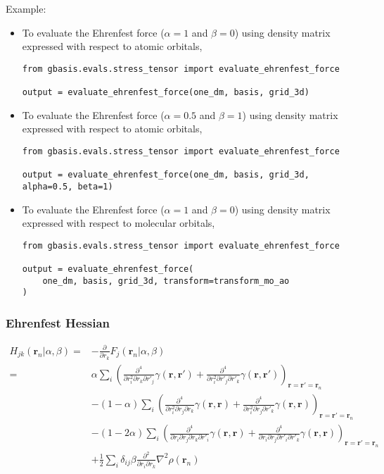\documentclass[letterpaper]{article}
\begin{document}
Example:
\begin{itemize}
\item To evaluate the Ehrenfest force ($\alpha=1$ and $\beta=0$)
  using density matrix expressed with respect to atomic orbitals,
  \begin{lstlisting}[xleftmargin=-25pt]
from gbasis.evals.stress_tensor import evaluate_ehrenfest_force

output = evaluate_ehrenfest_force(one_dm, basis, grid_3d)
\end{lstlisting}
\item To evaluate the Ehrenfest force ($\alpha=0.5$ and $\beta=1$)
  using density matrix expressed with respect to atomic orbitals,
  \begin{lstlisting}[xleftmargin=-25pt]
from gbasis.evals.stress_tensor import evaluate_ehrenfest_force

output = evaluate_ehrenfest_force(one_dm, basis, grid_3d, alpha=0.5, beta=1)
\end{lstlisting}
\item To evaluate the Ehrenfest force ($\alpha=1$ and $\beta=0$)
  using density matrix expressed with respect to molecular orbitals,
  \begin{lstlisting}[xleftmargin=-25pt]
from gbasis.evals.stress_tensor import evaluate_ehrenfest_force

output = evaluate_ehrenfest_force(
    one_dm, basis, grid_3d, transform=transform_mo_ao
)
\end{lstlisting}
\end{itemize}
\subsubsection{Ehrenfest Hessian}
\begin{equation}
  \begin{split}
    H_{jk}(\mathbf{r}_n | \alpha, \beta)
    =&
    - \frac{\partial}{\partial r_k} F_j(\mathbf{r}_n | \alpha, \beta)\\
    =&
    \alpha
    \sum_i
    \left(
      \frac{\partial^4}{\partial r^2_i \partial r_k \partial r'_j} \gamma(\mathbf{r}, \mathbf{r}')
      +\frac{\partial^4}{\partial r^2_i \partial r'_j \partial r'_k} \gamma(\mathbf{r}, \mathbf{r}')
    \right)_{\mathbf{r} = \mathbf{r}' = \mathbf{r}_n}\\
    &- (1 - \alpha)
    \sum_i
    \left(
      \frac{\partial^4}{\partial r^2_i \partial r_j \partial r_k} \gamma(\mathbf{r}, \mathbf{r})
      + \frac{\partial^4}{\partial r^2_i \partial r_j \partial r'_k} \gamma(\mathbf{r}, \mathbf{r})
    \right)_{\mathbf{r} = \mathbf{r}' = \mathbf{r}_n}\\
    &- (1 - 2\alpha)
    \sum_i
    \left(
      \frac{\partial^4}{\partial r_i \partial r_j \partial r_k \partial r'_i} \gamma(\mathbf{r}, \mathbf{r})
      + \frac{\partial^4}{\partial r_i \partial r_j \partial r'_i \partial r'_k} \gamma(\mathbf{r}, \mathbf{r})
    \right)_{\mathbf{r} = \mathbf{r}' = \mathbf{r}_n}\\
    &+ \frac{1}{2} \sum_i \delta_{ij} \beta
    \frac{\partial^2}{\partial r_i \partial r_k} \nabla^2 \rho(\mathbf{r}_n)\\
  \end{split}
\end{equation}
\end{document}
